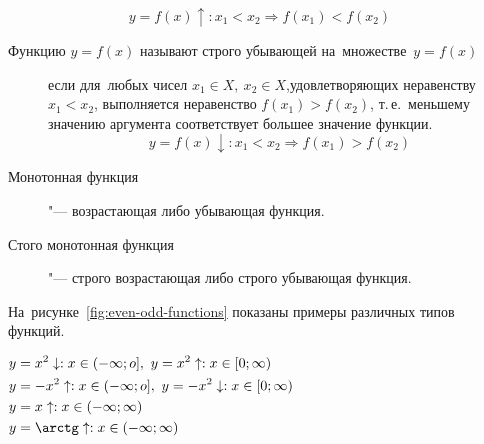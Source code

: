 \documentclass[]{scrartcl}
\begin{document}
{{\begin{description}
	\begin{equation}\label{eq:function-8}
	y=f(x)\uparrow :x_1 < x_2 \Rightarrow f(x_1) < f(x_2)
	\end{equation}
\end{description}
\begin{description}
	\item[Функцию ${\textstyle y=f(x)}$ называют строго убывающей на~множестве~${\textstyle y=f(x)}$] если для~любых чисел ${\textstyle x_1 \in X,\ x_2 \in X}$,удовлетворяющих неравенству ${\textstyle x_1 < x_2}$, выполняется неравенство ${\textstyle f(x_1) > f(x_2)}$, т.\,е.~меньшему значению аргумента соответствует большее значение функции.
	\begin{equation}\label{eq:function-9}
	y=f(x)\downarrow :x_1 < x_2 \Rightarrow f(x_1) > f(x_2)
	\end{equation}
\end{description}
\begin{description}
	\item[Монотонная функция]"--- возрастающая либо убывающая функция.
\end{description}
\begin{description}
	\item[Стого монотонная функция]"--- строго возрастающая либо строго убывающая функция.
\end{description}
На~рисунке~\ref{fig:even-odd-functions} показаны примеры различных типов функций.
\begin{Thexmpl}
	$\begin{aligned}
	y&=x^2\downarrow:x\in (-\infty;o],\ y=x^2\uparrow:x\in [0;\infty)\\
	y&=-x^2\uparrow:x\in (-\infty;o],\ y=-x^2\downarrow:x\in [0;\infty)\\
	y&=x\uparrow:x\in (-\infty;\infty)\\
	y&=\arctg \uparrow:x\in (-\infty;\infty)\\
	\end{aligned}$
\end{Thexmpl}

}}
\end{document}
